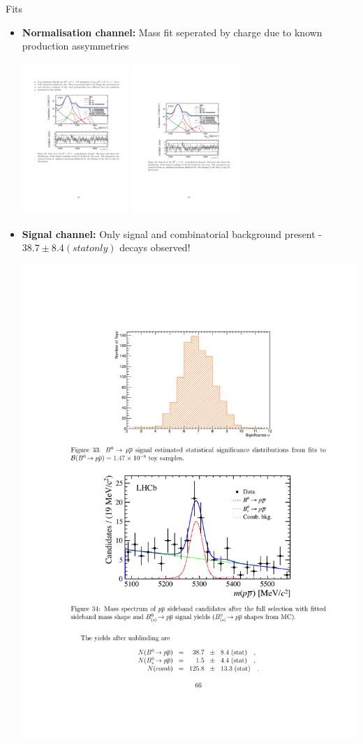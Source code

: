 \documentclass{beamer}
\begin{document}
\begin{frame}{Fits}
  \small
  \begin{itemize}
  \item \textbf{Normalisation channel:} Mass fit seperated by charge due to known production assymmetries
  \begin{center}
    \includegraphics[width=0.32\textwidth]{PPNormMassFit.pdf}
    \includegraphics[width=0.32\textwidth]{PPNormMassFitBar.pdf}
  \end{center}
  \item \textbf{Signal channel:} Only signal and combinatorial background present - $38.7\pm8.4(stat only)$ \decay{\Bd}{\proton\antiproton} decays observed!
    \begin{center}
      \includegraphics[width=.4\textwidth]{PPSignalMassFit.pdf}
    \end{center}
  \end{itemize}
\end{frame}
\end{document}
